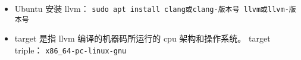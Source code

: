 
\begin{issues}
\issueDraft
\end{issues}


\begin{itemize}
\item Ubuntu 安装 llvm： \verb`sudo apt install clang或clang-版本号 llvm或llvm-版本号`
\item target 是指 llvm 编译的机器码所运行的 cpu 架构和操作系统。 target triple： \verb`x86_64-pc-linux-gnu`
\end{itemize}
